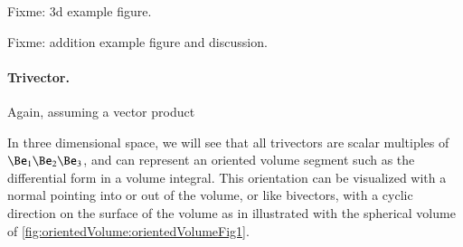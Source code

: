 Fixme: 3d example figure.

Fixme: addition example figure and discussion.

%

\paragraph{Trivector.}

Again, assuming a vector product


In three dimensional space, we will see that all trivectors are scalar multiples of \( \Be_1 \Be_2 \Be_3 \), and
can represent an oriented volume segment such as the differential form in a volume integral.
This orientation can be visualized with a normal pointing into or out of the volume, or like bivectors, with a cyclic direction on the surface of the volume as in illustrated with the spherical volume of \cref{fig:orientedVolume:orientedVolumeFig1}.
%
